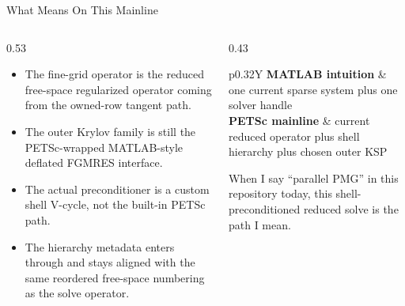 \documentclass[aspectratio=169,10pt]{beamer}
\begin{document}
\begin{frame}{What  Means On This Mainline}
\small
\begin{columns}[T,totalwidth=\textwidth]
\begin{column}{0.53\textwidth}
\begin{softbox}
\begin{itemize}
  \item The fine-grid operator is the reduced free-space regularized operator coming from the owned-row tangent path.
  \item The outer Krylov family is still the PETSc-wrapped MATLAB-style deflated FGMRES interface.
  \item The actual preconditioner is a custom shell V-cycle, not the built-in PETSc  path.
  \item The hierarchy metadata enters through  and stays aligned with the same reordered free-space numbering as the solve operator.
\end{itemize}
\end{softbox}
\end{column}
\begin{column}{0.43\textwidth}
\begin{tabularx}{\linewidth}{p{0.32\linewidth}Y}
\toprule
\textbf{MATLAB intuition} & one current sparse system plus one solver handle \\
\midrule
\textbf{PETSc mainline} & current reduced operator plus shell hierarchy plus chosen outer KSP \\
\bottomrule
\end{tabularx}
\vspace{0.16cm}
\begin{callout}
When I say ``parallel PMG'' in this repository today, this shell-preconditioned reduced solve is the path I mean.
\end{callout}
\end{column}
\end{columns}
\end{frame}
\end{document}
